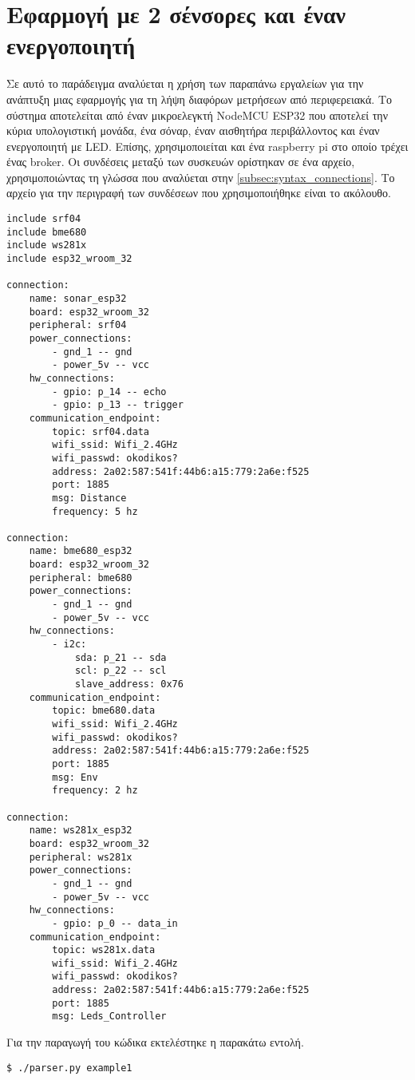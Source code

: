 \section{Εφαρμογή με 2 σένσορες και έναν ενεργοποιητή}
\label{sec:example1}

Σε αυτό το παράδειγμα αναλύεται η χρήση των παραπάνω εργαλείων για την ανάπτυξη μιας εφαρμογής για τη λήψη διαφόρων μετρήσεων από περιφερειακά. Το σύστημα αποτελείται από έναν μικροελεγκτή NodeMCU ESP32 που αποτελεί την κύρια υπολογιστική μονάδα, ένα σόναρ, έναν αισθητήρα περιβάλλοντος και έναν ενεργοποιητή με LED. Επίσης, χρησιμοποιείται και ένα raspberry pi στο οποίο τρέχει ένας broker. Οι συνδέσεις μεταξύ των συσκευών ορίστηκαν σε ένα αρχείο, χρησιμοποιώντας τη γλώσσα που αναλύεται στην \autoref{subsec:syntax_connections}. Το αρχείο για την περιγραφή των συνδέσεων που χρησιμοποιήθηκε είναι το ακόλουθο.

\newpage

\begin{lstlisting}
include srf04
include bme680
include ws281x
include esp32_wroom_32

connection:
	name: sonar_esp32
	board: esp32_wroom_32
	peripheral: srf04
	power_connections:
		- gnd_1 -- gnd
		- power_5v -- vcc 
	hw_connections:
		- gpio: p_14 -- echo
		- gpio: p_13 -- trigger
	communication_endpoint:
		topic: srf04.data
		wifi_ssid: Wifi_2.4GHz
		wifi_passwd: okodikos?
		address: 2a02:587:541f:44b6:a15:779:2a6e:f525
		port: 1885
		msg: Distance
		frequency: 5 hz

connection:
	name: bme680_esp32
	board: esp32_wroom_32
	peripheral: bme680
	power_connections:
		- gnd_1 -- gnd
		- power_5v -- vcc 
	hw_connections:
		- i2c: 
			sda: p_21 -- sda
			scl: p_22 -- scl
			slave_address: 0x76
	communication_endpoint:
		topic: bme680.data
		wifi_ssid: Wifi_2.4GHz
		wifi_passwd: okodikos?
		address: 2a02:587:541f:44b6:a15:779:2a6e:f525
		port: 1885
		msg: Env
		frequency: 2 hz

connection:
	name: ws281x_esp32
	board: esp32_wroom_32
	peripheral: ws281x
	power_connections:
		- gnd_1 -- gnd
		- power_5v -- vcc 
	hw_connections:
		- gpio: p_0 -- data_in
	communication_endpoint:
		topic: ws281x.data
		wifi_ssid: Wifi_2.4GHz
		wifi_passwd: okodikos?
		address: 2a02:587:541f:44b6:a15:779:2a6e:f525
		port: 1885
		msg: Leds_Controller
\end{lstlisting}

Για την παραγωγή του κώδικα εκτελέστηκε η παρακάτω εντολή.

\begin{lstlisting}
$ ./parser.py example1
\end{lstlisting}

